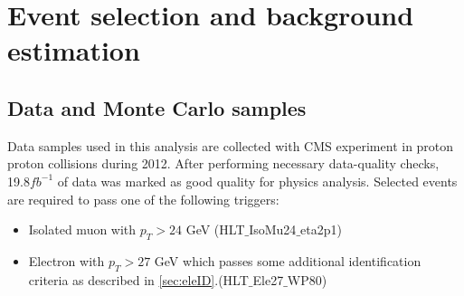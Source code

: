 
\chapter{Event selection and background estimation} %

\label{Chapter6} %




\section{Data and Monte Carlo samples}

Data samples used in this analysis are collected with CMS experiment in proton proton collisions during 2012. After performing necessary data-quality checks, 19.8$fb^{-1}$ of data was marked as good quality for physics analysis. Selected events are required to pass one of the following triggers:
\begin{itemize}
\item Isolated muon with $p_T>24$ GeV (HLT$\_$IsoMu24$\_$eta2p1)
\item Electron with $p_T>27$ GeV which passes some additional identification criteria as described in \ref{sec:eleID}.(HLT$\_$Ele27$\_$WP80)
\end{itemize}

